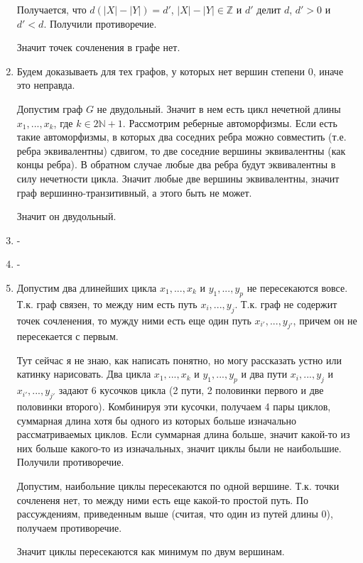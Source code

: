 \documentclass{article}
\begin{document}
\begin{enumerate}
Получается, что $d(|X| - |Y|) = d'$, $|X| - |Y| \in \mathbb{Z}$ и $d'$
делит $d$, $d' > 0$ и $d' < d$. Получили противоречие.

Значит точек сочленения в графе нет.

\item

Будем доказываеть для тех графов, у которых нет вершин степени 0,
иначе это неправда.

Допустим граф $G$ не двудольный. Значит в нем есть цикл нечетной длины
$x_1,...,x_k$, где $k \in 2\mathbb{N}+1$.
Рассмотрим реберные автоморфизмы. Если есть такие автоморфизмы, в
которых два соседних ребра можно совместить (т.е. ребра эквивалентны) сдвигом, то
две соседние вершины эквивалентны (как концы ребра). В обратном случае любые два ребра
будут эквивалентны в силу нечетности цикла. Значит любые две вершины
эквивалентны, значит граф вершинно-транзитивный, а этого быть не
может.

Значит он двудольный.


\item -

\item -

\item

Допустим два длинейших цикла $x_1,...,x_k$ и $y_1,...,y_p$ не пересекаются вовсе. Т.к. граф связен,
то между ним есть путь $x_i,...,y_j$. Т.к. граф не содержит точек сочленения, то
мужду ними есть еще один путь $x_{i'},...,y_{j'}$, причем он не
пересекается с первым.

Тут сейчас я не знаю, как написать понятно, но могу рассказать устно
или катинку нарисовать.
Два цикла $x_1,...,x_k$ и $y_1,...,y_p$ и два пути $x_{i},...,y_{j}$ и
$x_{i'},...,y_{j'}$ задают 6 кусочков цикла (2 пути, 2 половинки
первого и две половинки второго). Комбинируя эти кусочки, получаем 4
пары циклов, суммарная длина хотя бы одного из которых больше изначально рассматриваемых
циклов. Если суммарная длина больше, значит какой-то из них больше
какого-то из изначальных, значит циклы были не наибольшие. Получили
противоречие.

Допустим, наибольние циклы пересекаются по одной
вершине. Т.к. точки сочлененя нет, то между ними есть еще какой-то
простой путь. По рассуждениям, приведенным выше (считая, что один из
путей длины 0), получаем противоречие.

Значит циклы пересекаются как минимум по двум вершинам.

\end{enumerate}
\end{document}
